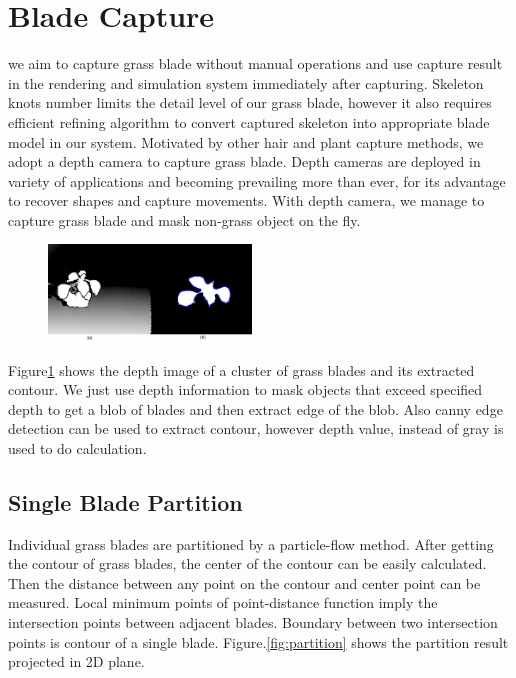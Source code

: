 \documentclass[10pt,journal,compsoc]{IEEEtran}
\begin{document}
\section{Blade Capture}\label{sec:capture}
we aim to capture grass blade without manual operations and use capture result in the rendering and simulation system immediately after capturing. Skeleton knots number limits the detail level of our grass blade, however it also requires efficient refining algorithm to convert captured skeleton into appropriate blade model in our system. Motivated by other hair and plant capture methods, we adopt a depth camera to capture grass blade. Depth cameras are deployed in variety of applications and becoming prevailing more than ever, for its advantage to recover shapes and capture movements. With depth camera, we manage to capture grass blade and mask non-grass object on the fly.\\

\begin{figure}
    \centering
    \includegraphics[width=0.48\textwidth]{figs/depth_contour.jpg}
    \label{fig:depthimage}
\end{figure}

Figure\ref{fig:depthimage} shows the depth image of a cluster of grass blades and its extracted contour. We just use depth information to mask objects that exceed specified depth to get a blob of blades and then extract edge of the blob. Also canny edge detection can be used to extract contour, however depth value, instead of gray is used to do calculation.

\subsection{Single Blade Partition}

Individual grass blades are partitioned by a particle-flow method\cite{neubert2007approximate}. After getting the contour of grass blades, the center of the contour can be easily calculated. Then the distance between any point on the contour and center point can be measured. Local minimum points of point-distance function imply the intersection points between adjacent blades. Boundary between two intersection points is contour of a single blade. Figure.\ref{fig:partition} shows the partition result projected in 2D plane.
\end{document}
